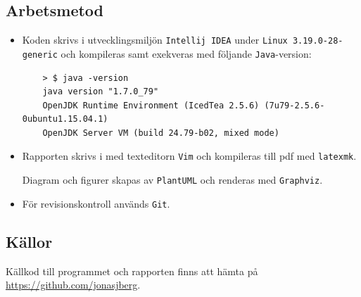 \subsection*{Arbetsmetod}
\begin{itemize}
    \item Koden skrivs i utvecklingsmiljön \texttt{Intellij IDEA} under
    \texttt{Linux 3.19.0-28-generic} och kompileras samt exekveras med följande
    \texttt{Java}-version:
    \begin{verbatim}
    > $ java -version
    java version "1.7.0_79"
    OpenJDK Runtime Environment (IcedTea 2.5.6) (7u79-2.5.6-0ubuntu1.15.04.1)
    OpenJDK Server VM (build 24.79-b02, mixed mode)
    \end{verbatim}

    \item Rapporten skrivs i \latex med texteditorn \texttt{Vim} och kompileras
    till pdf med \texttt{latexmk}.
    \par Diagram och figurer skapas av \texttt{PlantUML} och renderas med
    \texttt{Graphviz}.

    \item För revisionskontroll används \texttt{Git}.
\end{itemize}

\subsection*{Källor}
\par Källkod till programmet och rapporten finns att hämta på \url{https://github.com/jonasjberg}.

